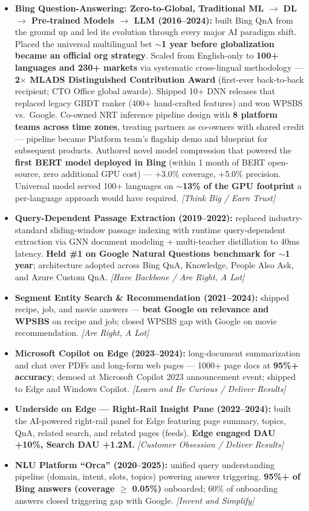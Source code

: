 \documentclass[10.5pt,letterpaper]{article}
\newcommand{\lp}[1]{\textcolor{blue!55!black}{\small\textit{[#1]}}}
\begin{document}
\begin{itemize}
  \item \textbf{Bing Question-Answering: Zero-to-Global, Traditional ML $\to$ DL $\to$ Pre-trained Models $\to$ LLM (2016--2024):} built Bing QnA from the ground up and led its evolution through every major AI paradigm shift. Placed the universal multilingual bet \textbf{$\sim$1 year before globalization became an official org strategy}. Scaled from English-only to \textbf{100+ languages and 230+ markets} via systematic cross-lingual methodology — \textbf{2$\times$ MLADS Distinguished Contribution Award} (first-ever back-to-back recipient; CTO Office global awards). Shipped 10+ DNN releases that replaced legacy GBDT ranker (400+ hand-crafted features) and won WPSBS vs.\ Google. Co-owned NRT inference pipeline design with \textbf{8 platform teams across time zones}, treating partners as co-owners with shared credit — pipeline became Platform team's flagship demo and blueprint for subsequent products. Authored novel model compression that powered the \textbf{first BERT model deployed in Bing} (within 1 month of BERT open-source, zero additional GPU cost) — +3.0\% coverage, +5.0\% precision. Universal model served 100+ languages on \textbf{$\sim$13\% of the GPU footprint} a per-language approach would have required. \lp{Think Big / Earn Trust}
  \item \textbf{Query-Dependent Passage Extraction (2019--2022):} replaced industry-standard sliding-window passage indexing with runtime query-dependent extraction via GNN document modeling + multi-teacher distillation to 40ms latency. \textbf{Held \#1 on Google Natural Questions benchmark for $\sim$1 year}; architecture adopted across Bing QnA, Knowledge, People Also Ask, and Azure Custom QnA. \lp{Have Backbone / Are Right, A Lot}
  \item \textbf{Segment Entity Search \& Recommendation (2021--2024):} shipped recipe, job, and movie answers — \textbf{beat Google on relevance and WPSBS} on recipe and job; closed WPSBS gap with Google on movie recommendation. \lp{Are Right, A Lot}
  \item \textbf{Microsoft Copilot on Edge (2023--2024):} long-document summarization and chat over PDFs and long-form web pages — 1000+ page docs at \textbf{95\%+ accuracy}; demoed at Microsoft Copilot 2023 announcement event; shipped to Edge and Windows Copilot. \lp{Learn and Be Curious / Deliver Results}
  \item \textbf{Underside on Edge --- Right-Rail Insight Pane (2022--2024):} built the AI-powered right-rail panel for Edge featuring page summary, topics, QnA, related search, and related pages (feeds). \textbf{Edge engaged DAU +10\%, Search DAU +1.2M.} \lp{Customer Obsession / Deliver Results}
  \item \textbf{NLU Platform ``Orca'' (2020--2025):} unified query understanding pipeline (domain, intent, slots, topics) powering answer triggering. \textbf{95\%+ of Bing answers (coverage $\ge$ 0.05\%)} onboarded; 60\% of onboarding answers closed triggering gap with Google. \lp{Invent and Simplify}
\end{itemize}
\end{document}
